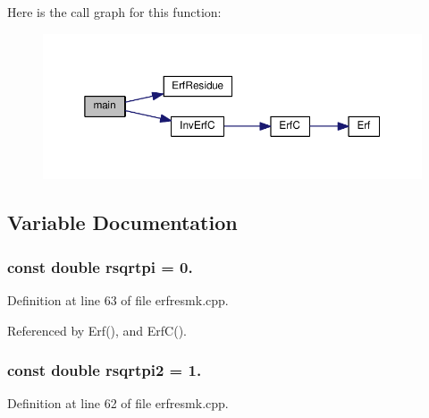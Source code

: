 Here is the call graph for this function\-:\nopagebreak
\begin{figure}[H]
\begin{center}
\leavevmode
\includegraphics[width=350pt]{rnd_2erfresmk_8cpp_ae66f6b31b5ad750f1fe042a706a4e3d4_cgraph}
\end{center}
\end{figure}




\subsection{Variable Documentation}
\subsubsection[{rsqrtpi}]{\setlength{\rightskip}{0pt plus 5cm}const double rsqrtpi = 0.\hspace{0.3cm}{\ttfamily [static]}}\label{rnd_2erfresmk_8cpp_a5d77540ba72d2896426a602d0608ae08}


Definition at line 63 of file erfresmk.\-cpp.



Referenced by Erf(), and Erf\-C().

\subsubsection[{rsqrtpi2}]{\setlength{\rightskip}{0pt plus 5cm}const double rsqrtpi2 = 1.\hspace{0.3cm}{\ttfamily [static]}}\label{rnd_2erfresmk_8cpp_ad6ff57468381393a5aa6b6a666ec09bf}


Definition at line 62 of file erfresmk.\-cpp.



